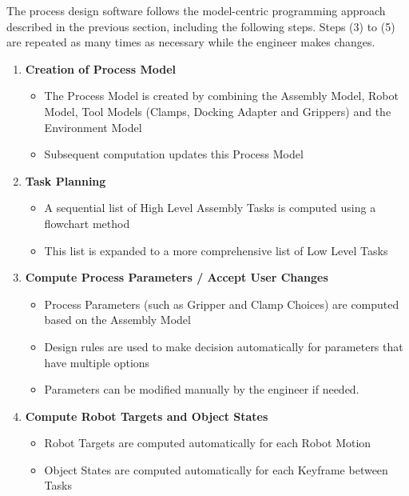 The process design software follows the model-centric programming approach described in the previous section, including the following steps. Steps (3) to (5) are repeated as many times as necessary while the engineer makes changes.
\begin{enumerate}
	\item \textbf{Creation of Process Model}
	\begin{itemize}
		\item The Process Model is created by combining the Assembly Model, Robot Model, Tool Models (Clamps, Docking Adapter and Grippers) and the Environment Model 
		\item Subsequent computation updates this Process Model
	\end{itemize}

	\item \textbf{Task Planning}
	\begin{itemize}
		\item A sequential list of High Level Assembly Tasks is computed using a flowchart method 
		\item This list is expanded to a more comprehensive list of Low Level Tasks 
	\end{itemize}

	\item \textbf{Compute Process Parameters / Accept User Changes}
	\begin{itemize}
		\item Process Parameters (such as Gripper and Clamp Choices) are computed based on the Assembly Model 
		\item Design rules are used to make decision automatically for parameters that have multiple options
		\item Parameters can be modified manually by the engineer if needed.
	\end{itemize}
	
	\item \textbf{Compute Robot Targets and Object States}
	\begin{itemize}
		\item Robot Targets are computed automatically for each Robot Motion 
		\item Object States are computed automatically for each Keyframe between Tasks 
	\end{itemize}
	

\end{enumerate}
